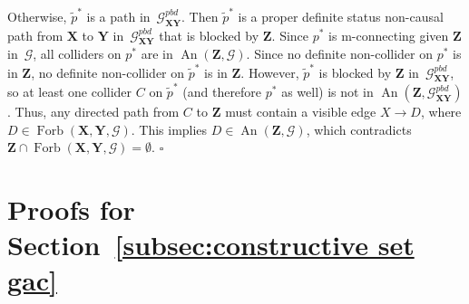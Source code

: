 \documentclass[11pt,a4paper]{article}
\newenvironment{proofof}[1][]{\begin{trivlist}
   \item[\hskip \labelsep {\bfseries Proof of #1.}]}{\hfill{}$\square$\end{trivlist}}
\DeclareMathOperator{\An}{An}
\DeclareMathOperator{\Forbi}{Forb}
\newcommand{\g}[1][G]{\mathcal{#1}}
\newcommand{\gpbd}[2][G]{\mathcal{#1}_{\mathbf{#2}}^{pbd}}
\newcommand{\fb}[2][X,Y]{\Forbi(\mathbf{#1},#2)}%
\newcommand{\pstar}[1][p]{{#1}^{*}}
\begin{document}
\begin{proofof}[Theorem~\ref{theorem:gac-alt}]
Otherwise, $\tilde{p}^*$ is a path in~$\gpbd{\mathbf{XY}}$. Then $\tilde{p}^*$ is a proper definite status non-causal path from $\mathbf{X}$ to $\mathbf{Y}$ in~$\gpbd{\mathbf{XY}}$ that is blocked by $\mathbf{Z}$. Since $\pstar$ is m-connecting given $\mathbf{Z}$ in~$\g$, all colliders on $\pstar$ are in $\An(\mathbf{Z}, \g)$. Since no definite non-collider on $\pstar$ is in $\mathbf{Z}$, no definite non-collider on $\tilde{p}^*$ is in $\mathbf{Z}$. However, $\tilde{p}^*$ is blocked by $\mathbf{Z}$ in~$\gpbd{\mathbf{XY}}$, so at least one collider $C$ on $\tilde{p}^*$ (and therefore $\pstar$ as well) is not in $\An(\mathbf{Z},\gpbd{\mathbf{XY}})$. Thus, any directed path from $C$ to $\mathbf{Z}$ must contain a visible edge $X \rightarrow D$, where $D \in \fb{\g}$. This implies $D \in \An(\mathbf{Z},\g)$, which contradicts $\mathbf{Z} \cap \fb{\g} = \emptyset$.
\end{proofof}


\section{Proofs for Section~\ref{subsec:constructive set gac}} \label{subsec:proofs constructive}
\end{document}
